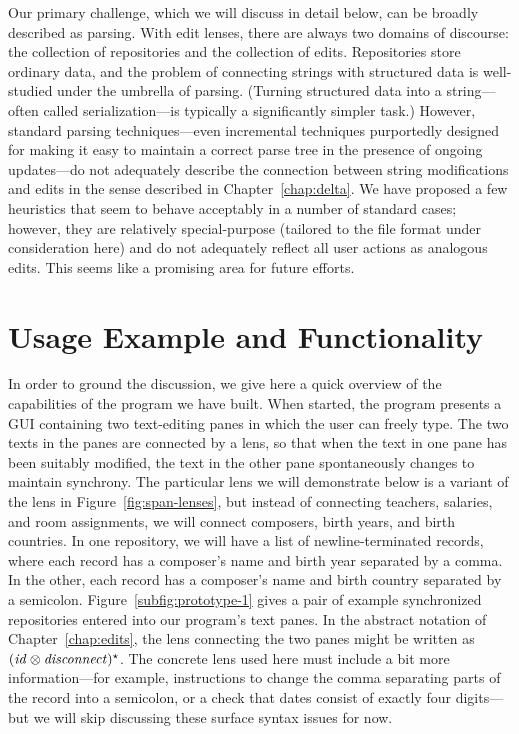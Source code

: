Our primary challenge, which we will discuss in detail below, can be broadly
described as parsing. With edit lenses, there are always two domains of
discourse: the collection of repositories and the collection of edits.
Repositories store ordinary data, and the problem of connecting strings with
structured data is well-studied under the umbrella of parsing. (Turning
structured data into a string---often called serialization---is typically a
significantly simpler task.) However, standard parsing techniques---even
incremental techniques purportedly designed for making it easy to maintain a
correct parse tree in the presence of ongoing updates---do not adequately
describe the connection between string modifications and edits in the sense
described in Chapter~\ref{chap:delta}. We have proposed a few heuristics
that seem to behave acceptably in a number of standard cases; however, they
are relatively special-purpose (tailored to the file format under
consideration here) and do not adequately reflect all user actions as
analogous edits. This seems like a promising area for future efforts.

\section{Usage Example and Functionality}
\label{sec:impl-usage}
In order to ground the discussion, we give here a quick overview of the
capabilities of the program we have built. When started, the program
presents a GUI containing two text-editing panes in which the user can
freely type. The two texts in the panes are connected by a lens, so that
when the text in one pane has been suitably modified, the text in the other
pane spontaneously changes to maintain synchrony. The particular lens we
will demonstrate below is a variant of the lens in
Figure~\ref{fig:span-lenses}, but instead of connecting teachers, salaries,
and room assignments, we will connect composers, birth years, and birth
countries. In one repository, we will have a list of newline-terminated
records, where each record has a composer's name and birth year separated by
a comma. In the other, each record has a composer's name and birth country
separated by a semicolon. Figure~\ref{subfig:prototype-1} gives a pair of
example synchronized repositories entered into our program's text panes. In
the abstract notation of Chapter~\ref{chap:edits}, the lens connecting the
two panes might be written as $(\mathit{id}\otimes\mathit{disconnect})^\star$. The concrete
lens used here must include a bit more information---for example,
instructions to change the comma separating parts of the record into a
semicolon, or a check that dates consist of exactly four digits---but we
will skip discussing these surface syntax issues for now.


